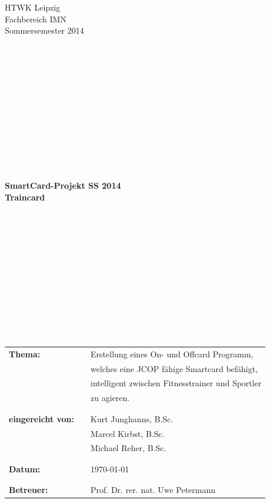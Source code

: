 \documentclass[a4paper,12pt]{article}
\begin{document}
 
\begin{titlepage}

\begin{small}
\begin{flushleft}
\vfill {
HTWK Leipzig\\
Fachbereich IMN \\
Sommersemester 2014}
\end{flushleft}
\end{small}
 \begin{verbatim}












\end{verbatim}
\begin{center}
\begin{Large}
\textsf{\textbf{
SmartCard-Projekt SS 2014\\
Traincard\\
}}
\end{Large}
\end{center}
\begin{verbatim}












\end{verbatim}
\begin{flushleft}
\begin{tabular}{lll}
\textbf{Thema:} & & Erstellung eines On- und Offcard Programm,\\
& & welches eine JCOP fähige Smartcard befähigt,\\
& & intelligent zwischen Fitnesstrainer und Sportler\\
& & zu agieren.\\
& & \\
& & \\
\textbf{eingereicht von:} & & Kurt Junghanns, B.Sc.\\
& & Marcel Kirbst, B.Sc.\\
& & Michael Reher, B.Sc.\\
& & \\
& & \\
\textbf{Datum:} & & \today\\
& & \\
& & \\
\textbf{Betreuer:} & & Prof. Dr. rer. nat. Uwe Petermann\\
\end{tabular}
\end{flushleft} 

\end{titlepage}
\end{document}
